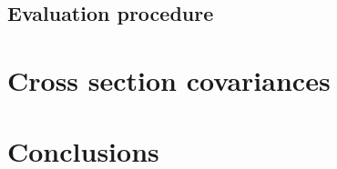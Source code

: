 \documentclass[twocolumn,amsmath,amssymb,10pt,groupedaddress,a4paper]{revtex4}
\begin{document}
\subsection{Evaluation procedure}

\section{Cross section  covariances}
\section{Conclusions}



\end{document}
